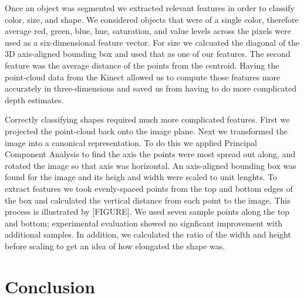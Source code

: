 \documentclass[11pt]{article}
\newcommand{\xxx}[1]{{\bf \color{red} #1}}
\begin{document}
Once an object was segmented we extracted relevant features in order to classify color, size, and shape. We considered objects that were of a single color, therefore average red, green, blue, hue, saturation, and value levels across the pixels were used as a six-dimensional feature vector. For size we calcuated the diagonal of the 3D axis-aligned bounding box and used that as one of our features. The second feature was the average distance of the points from the centroid. Having the point-cloud data from the Kinect allowed us to compute those features more accurately in three-dimensions and saved us from having to do more complicated depth estimates. 

Correctly classifying shapes required much more complicated features. First we projected the point-cloud back onto the image plane. Next we transformed the image into a canonical representation. To do this we applied Principal Component Analysis to find the axis the points were most spread out along, and rotated the image so that axis was horizontal. An axis-aligned bounding box was found for the image and its heigh and width were scaled to unit lenghts. To extract features we took evenly-spaced points from the top and bottom edges of the box and calculated the vertical distance from each point to the image. This process is illustrated by [FIGURE]. We used seven sample points along the top and bottom; experimental evaluation showed no signficant improvement with additional samples. In addition, we calculated the ratio of the width and height before scaling to get an idea of how elongated the shape was. 




\section{Conclusion}




\end{document}

